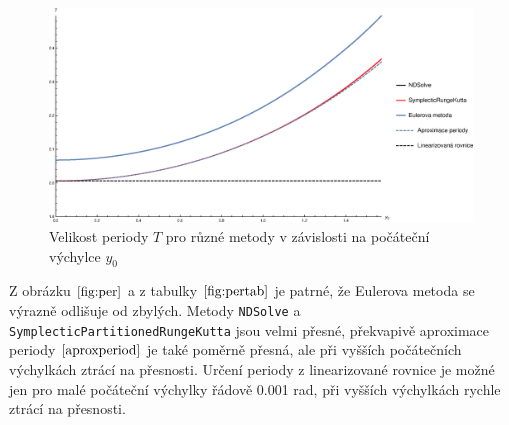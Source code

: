 \begin{figure}[h]
  \centering
  \includegraphics[width=17cm]{figures/PER2+LIN.eps}
  \caption{Velikost periody $T$ pro různé metody v závislosti na počáteční výchylce $y_{0}$}
  \label{fig:per}
\end{figure}

Z obrázku $\eqref{fig:per}$ a z tabulky $\eqref{fig:pertab}$ je patrné, že Eulerova metoda se výrazně odlišuje od zbylých. Metody \texttt{NDSolve} a \texttt{SymplecticPartitionedRungeKutta} jsou velmi přesné, překvapivě aproximace periody $\eqref{aproxperiod}$ je také poměrně přesná, ale při vyšších počátečních výchylkách ztrácí na přesnosti. Určení periody z linearizované rovnice je možné jen pro malé počáteční výchylky řádově 0.001 \si{rad}, při vyšších výchylkách rychle ztrácí na přesnosti.



